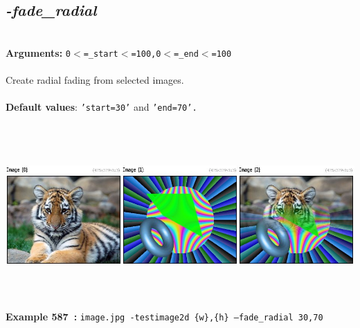 \documentclass[a4paper,11pt,twoside]{book}
\begin{document}
\subsection{\emph{-fade\_radial} }\vspace*{-0.5em}
~\\\textbf{Arguments: } 
{\small \texttt{0$<$=\_start$<$=100,0$<$=\_end$<$=100}}\\~\\
Create radial fading from selected images.
~\\~\\\textbf{Default values}: {\small \texttt{'start=30'} and \texttt{'end=70'.}}
\begin{center}\includegraphics[keepaspectratio=true,height=7cm,width=\textwidth]{img/gmic_def587.jpg}\\
{\footnotesize \textbf{Example 587~:} \texttt{image.jpg -testimage2d \{w\},\{h\} --fade\_radial 30,70}}
\end{center}
\end{document}
